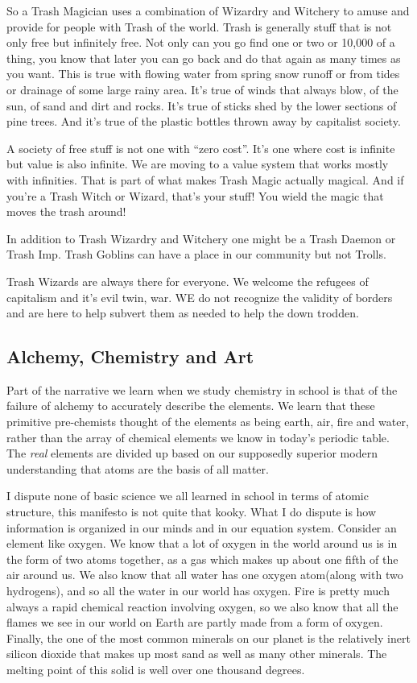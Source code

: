 So a Trash Magician uses a combination of Wizardry and Witchery to amuse
and provide for people with Trash of the world. Trash is generally stuff
that is not only free but infinitely free. Not only can you go find one
or two or 10,000 of a thing, you know that later you can go back and do
that again as many times as you want. This is true with flowing water
from spring snow runoff or from tides or drainage of some large rainy
area. It's true of winds that always blow, of the sun, of sand and dirt
and rocks. It's true of sticks shed by the lower sections of pine trees.
And it's true of the plastic bottles thrown away by capitalist society.

A society of free stuff is not one with ``zero cost''. It's one where
cost is infinite but value is also infinite. We are moving to a value
system that works mostly with infinities. That is part of what makes
Trash Magic actually magical. And if you're a Trash Witch or Wizard,
that's your stuff! You wield the magic that moves the trash around!

In addition to Trash Wizardry and Witchery one might be a Trash Daemon
or Trash Imp. Trash Goblins can have a place in our community but not
Trolls.

Trash Wizards are always there for everyone. We welcome the refugees of
capitalism and it's evil twin, war. WE do not recognize the validity of
borders and are here to help subvert them as needed to help the down
trodden.

\subsection{Alchemy, Chemistry and Art}\label{alchemy-chemistry-and-art}

Part of the narrative we learn when we study chemistry in school is that
of the failure of alchemy to accurately describe the elements. We learn
that these primitive pre-chemists thought of the elements as being
earth, air, fire and water, rather than the array of chemical elements
we know in today's periodic table. The \emph{real} elements are divided
up based on our supposedly superior modern understanding that atoms are
the basis of all matter.

I dispute none of basic science we all learned in school in terms of
atomic structure, this manifesto is not quite that kooky. What I do
dispute is how information is organized in our minds and in our equation
system. Consider an element like oxygen. We know that a lot of oxygen in
the world around us is in the form of two atoms together, as a gas which
makes up about one fifth of the air around us. We also know that all
water has one oxygen atom(along with two hydrogens), and so all the
water in our world has oxygen. Fire is pretty much always a rapid
chemical reaction involving oxygen, so we also know that all the flames
we see in our world on Earth are partly made from a form of oxygen.
Finally, the one of the most common minerals on our planet is the
relatively inert silicon dioxide that makes up most sand as well as many
other minerals. The melting point of this solid is well over one
thousand degrees.

